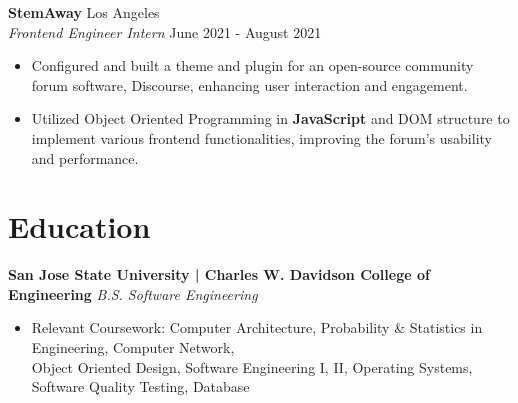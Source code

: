 \documentclass[a4paper,10pt]{article}
\begin{document}
\noindent \textbf{StemAway} \hfill {Los Angeles}\\
\textit{Frontend Engineer Intern} \hfill {June 2021 - August 2021}\vspace{-\baselineskip}
\vspace{2.5mm}
\begin{itemize}
    \item Configured and built a theme and plugin for an open-source community forum software, Discourse, enhancing user interaction and engagement.\vspace{0.3ex}
    \item Utilized Object Oriented Programming in \textbf{JavaScript} and DOM structure to implement various frontend functionalities, improving the forum’s usability and performance.\vspace{0.3ex}
\end{itemize}

\vspace{3mm}

\section*{Education}\vspace{0.5mm}
\noindent \textbf{San Jose State University | Charles W. Davidson College of Engineering} \hfill \textit{B.S. Software Engineering} \hfill 
\begin{itemize}
    \item Relevant Coursework: Computer Architecture, Probability \& Statistics in Engineering, Computer Network,\\Object Oriented Design, Software Engineering I, II, Operating Systems, Software Quality Testing, Database
\end{itemize}
\end{document}
